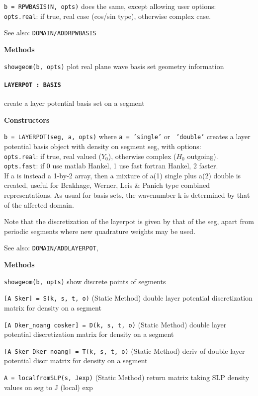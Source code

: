   {\tt b = RPWBASIS(N, opts)} does the same, except allowing user options:\\
   {\tt opts.real}: if true, real case (cos/sin type), otherwise complex case.

See also: {\tt DOMAIN/ADDRPWBASIS}


\textbf{Methods}

{\tt showgeom(b, opts)} plot real plane wave basis set geometry information

\newpage

\paragraph{\tt LAYERPOT : BASIS} create a layer potential basis set on a segment

\textbf{Constructors}

{\tt b = LAYERPOT(seg, a, opts)} where {\tt a = 'single'} or {\tt
  'double'} creates a layer
   potential basis object with density on segment seg, with options:\\
    {\tt opts.real}: if true, real valued ($Y_0$), otherwise complex
    ($H_0$ outgoing).\\
    {\tt opts.fast}: if 0 use matlab Hankel, 1 use fast fortran
    Hankel, 2 faster.\\
   If a is instead a 1-by-2 array, then a mixture of a(1) single plus a(2)
   double is created, useful for Brakhage, Werner, Leis \& Panich type
   combined representations. As usual for basis sets, the wavenumber k is
   determined by that of the affected domain.

   Note that the discretization of the layerpot is given by that of the seg,
    apart from periodic segments where new quadrature weights may be used.

See also: {\tt DOMAIN/ADDLAYERPOT},

\textbf{Methods}

{\tt showgeom(b, opts)} show discrete points of segments


{\tt [A Sker] = S(k, s, t, o)} (Static Method) double layer potential
discretization matrix for density on a segment

{\tt [A Dker\_noang cosker] = D(k, s, t, o)} (Static Method) double
layer potential discretization matrix for density on a segment

{\tt [A Sker Dker\_noang] = T(k, s, t, o)} (Static Method) deriv of double layer
potential discr matrix for density on a segment

{\tt A = localfromSLP(s, Jexp)} (Static Method) return matrix taking SLP density
values on seg to J (local) exp

